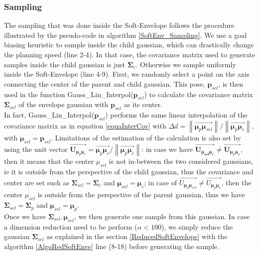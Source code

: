 \documentclass[letterpaper, 10 pt, conference]{ieeeconf}  %
\newcommand{\mb}[1]{{\boldsymbol{#1}}}
\newcommand\norm[1]{\left\lVert#1\right\rVert}
\begin{document}
\subsubsection{Sampling}\leavevmode\par
The sampling that was done inside the Soft-Envelope follows the procedure illustrated by the pseudo-code in algorithm \ref{SoftEnv_Sampling}.
We use a goal biasing heuristic to sample inside the child gaussian, which can drastically change the planning speed (line 2-4). In that case, the covariance matrix used to generate samples inside the child gaussian is just $\mb{\Sigma}_c$. Otherwise we sample uniformly inside the Soft-Envelope (line 4-9).  First, we randomly select a point on the axis connecting the center of the parent and child gaussian. This pose, $\mb{p}_{sel}$, is then used in the function {\selectfont Gauss\_Lin\_Interpol($\mb{p}_{sel}$)} to calculate the covariance matrix $\mb{\Sigma}_{sel}$  of the envelope gaussian with $\mb{p}_{sel}$ as its center.\\
In fact, {\selectfont Gauss\_Lin\_Interpol($\mb{p}_{sel}$)} performs the same linear interpolation of the covariance matrix as in equation \ref{equaInterCov} with $\Delta d = \norm{\overrightarrow{\mb{\mu}_p\mb{\mu}_{sel}}}/{\norm{\overrightarrow{\mb{\mu}_p\mb{\mu}_c}}}$, with $\mb{\mu}_{sel} = \mb{p}_{sel}$. Limitations of the estimation of the calculation is also set by using the unit vector $\overrightarrow{\mb{U}_{\mb{\mu}_p\mb{\mu}_{c}}} = \overrightarrow{\mb{\mu}_p\mb{\mu}_{c}}/\norm{\overrightarrow{\mb{\mu}_p\mb{\mu}_{c}}}$: in case we have $\overrightarrow{\mb{U}_{\mb{\mu_{sel}}\mb{\mu_{c}}}} \neq \overrightarrow{\mb{U}_{\mb{\mu}_p\mb{\mu_{c}}}} $, then it means that the center $\mu_{sel}$ is not in-between the two considered gaussians, ie it is outside from the perspective of the child gaussian, thus the covariance and center are set such as $\mb{\Sigma}_{sel}=\mb{\Sigma}_c$ and $\mb{\mu}_{sel}=\mb{\mu}_c$; in case of $\overrightarrow{U_{\mb{\mu}_{p}\mb{\mu}_{sel}}} \neq \overrightarrow{U_{\mb{\mu}_p\mb{\mu_{c}}}} $, then the center $\mu_{sel}$ is outside from the perspective of the parent gaussian, thus we have $\mb{\Sigma}_{sel}=\mb{\Sigma}_p$ and $\mb{\mu}_{sel}=\mb{\mu}_p$.\\
Once we have $\mb{\Sigma}_{sel}, \mb{\mu}_{sel}$, we then generate one sample from this gaussian. In case a dimension reduction need to be perform ($\alpha<100$), we simply reduce the gaussian $\mb{\Sigma}_{sel}$ as explained in the section \ref{ReducedSoftEnvelope} with the algorithm \ref{AlgoRedSoftEnve} line (8-18) before generating the sample. 
\\
\end{document}
